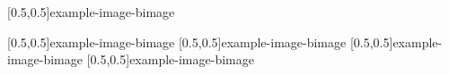 



\graphicspath{{Figures/}{Figures/Iceland}}


\subtitle{Day 2}
\date{08.10.2019}


    
    
    [0.5,0.5]{example-image-b}{image}
    
    [0.5,0.5]{example-image-b}{image}
%     
    [0.5,0.5]{example-image-b}{image}
%     
    [0.5,0.5]{example-image-b}{image}
%     
    [0.5,0.5]{example-image-b}{image}
%     

